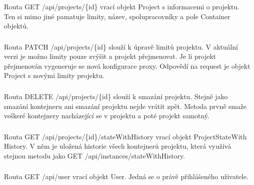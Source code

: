 \documentclass[a4paper,oneside,12pt]{report}
\begin{document}
\subsubsection{}

Routa GET /api/projects/\{id\} vrací objekt Project s informacemi o projektu.
Ten si mimo jiné pamatuje limity, název, spolupracovníky a pole Container objektů.

\subsubsection{}

Routa PATCH /api/projects/\{id\} slouží k úpravě limitů projektu.
V aktuální verzi je možno limity pouze zvýšit a projekt přejmenovat.
Je li projekt přejmenován vygeneruje se nová konfigurace proxy.
Odpovědí na request je objekt Project s novými limity projektu.

\subsubsection{}

Routa DELETE /api/projects/\{id\} slouží k smazání projektu.
Stejně jako  smazání kontejneru ani smazání projektu nejde vrátit zpět.
Metoda prvně smaže veškeré kontejnery nacházející se v projektu a poté projekt samotný.

\subsubsection{}

Routa GET /api/projects/\{id\}/stateWithHistory vrací objekt ProjectStateWith History.
V něm je uložená historie všech kontejnerů projektu, která využívá stejnou metodu jako GET /api/instances/stateWithHistory.

\subsubsection{\color{apiblue}{GET -- /api/user}}

Routa GET /api/user vrací objekt User.
Jedná se o právě přihlášeného uživatele.

\subsubsection{\color{apiblue}{GET -- /api/logout}}
\end{document}
